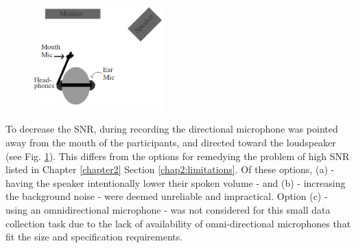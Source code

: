   
\DIFaddbegin \begin{figure}
\centering
  \includegraphics[width=0.45\textwidth]{figure/overallSetUp_new.png}
  \caption{}
  \label{fig:overallSetUp_new}
\end{figure}
\DIFaddend To decrease the SNR, during recording the directional microphone was pointed away from the mouth of the participants, and directed toward the loudspeaker (see Fig. \ref{fig:overallSetUp_new}).  This differs from the options for remedying the problem of high SNR listed in Chapter \ref{chapter2} Section \ref{chap2:limitations}.  Of these options, (a) - having the speaker intentionally lower their spoken volume - and (b) - increasing the background noise - were deemed unreliable and impractical.
\DIFdelbegin %
{%
}
\DIFdelend Option (c) - using an omnidirectional microphone - was not considered for this small data collection task due to the lack of availability of omni-directional microphones that fit the size and specification requirements.  \DIFaddbegin {}\DIFaddend 

